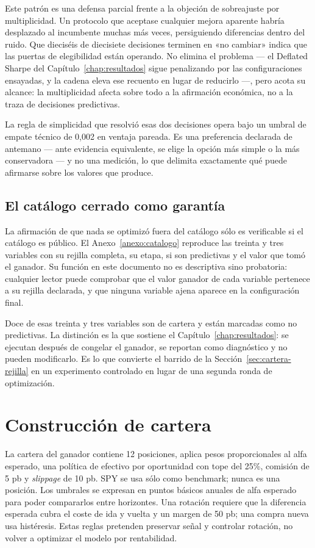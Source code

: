 Este patrón es una defensa parcial frente a la objeción de sobreajuste por multiplicidad. Un
protocolo que aceptase cualquier mejora aparente habría desplazado al incumbente muchas más veces,
persiguiendo diferencias dentro del ruido. Que dieciséis de diecisiete decisiones terminen en «no
cambiar» indica que las puertas de elegibilidad están operando. No elimina el problema --- el
Deflated Sharpe del Capítulo~\ref{chap:resultados} sigue penalizando por las configuraciones
ensayadas, y la cadena eleva ese recuento en lugar de reducirlo ---, pero acota su alcance: la
multiplicidad afecta sobre todo a la afirmación económica, no a la traza de decisiones predictivas.

La regla de simplicidad que resolvió esas dos decisiones opera bajo un umbral de empate técnico de
0,002 en ventaja pareada. Es una preferencia declarada de antemano --- ante evidencia equivalente,
se elige la opción más simple o la más conservadora --- y no una medición, lo que delimita
exactamente qué puede afirmarse sobre los valores que produce.

\subsection*{El catálogo cerrado como garantía}

La afirmación de que nada se optimizó fuera del catálogo sólo es verificable si el catálogo es
público. El Anexo~\ref{anexo:catalogo} reproduce las treinta y tres variables con su rejilla
completa, su etapa, si son predictivas y el valor que tomó el ganador. Su función en este documento
no es descriptiva sino probatoria: cualquier lector puede comprobar que el valor ganador de cada
variable pertenece a su rejilla declarada, y que ninguna variable ajena aparece en la configuración
final.

Doce de esas treinta y tres variables son de cartera y están marcadas como no predictivas. La
distinción es la que sostiene el Capítulo~\ref{chap:resultados}: se ejecutan después de congelar el
ganador, se reportan como diagnóstico y no pueden modificarlo. Es lo que convierte el barrido de la
Sección~\ref{sec:cartera-rejilla} en un experimento controlado en lugar de una segunda ronda de
optimización.

\section{Construcción de cartera}

La cartera del ganador contiene 12 posiciones, aplica pesos proporcionales al alfa esperado, una
política de efectivo por oportunidad con tope del 25\%, comisión de 5 pb y \textit{slippage} de 10
pb. SPY se usa sólo como benchmark; nunca es una posición. Los umbrales se expresan en puntos
básicos anuales de alfa esperado para poder compararlos entre horizontes. Una rotación requiere que
la diferencia esperada cubra el coste de ida y vuelta y un margen de 50 pb; una compra nueva usa
histéresis. Estas reglas pretenden preservar señal y controlar rotación, no volver a optimizar el
modelo por rentabilidad.


